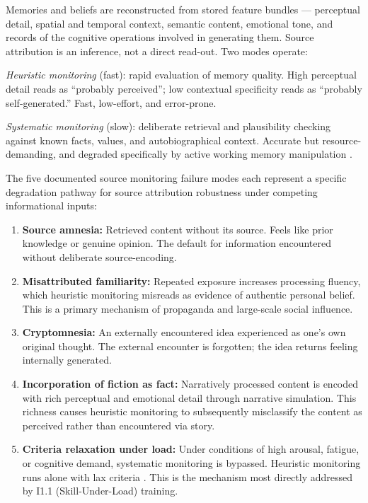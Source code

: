 \documentclass[12pt, a4paper]{article}
\begin{document}
Memories and beliefs are reconstructed from stored feature bundles --- perceptual
detail, spatial and temporal context, semantic content, emotional tone, and records
of the cognitive operations involved in generating them. Source attribution is an
inference, not a direct read-out. Two modes operate:

\emph{Heuristic monitoring} (fast): rapid evaluation of memory quality. High
perceptual detail reads as ``probably perceived''; low contextual specificity reads
as ``probably self-generated.'' Fast, low-effort, and error-prone.

\emph{Systematic monitoring} (slow): deliberate retrieval and plausibility checking
against known facts, values, and autobiographical context. Accurate but
resource-demanding, and degraded specifically by active working memory manipulation
\citep{maniscalco2015}.

The five documented source monitoring failure modes each represent a specific
degradation pathway for source attribution robustness under competing informational inputs:

\begin{enumerate}[leftmargin=2em]
\item \textbf{Source amnesia:} Retrieved content without its source. Feels like prior
knowledge or genuine opinion. The default for information encountered without
deliberate source-encoding.
\item \textbf{Misattributed familiarity:} Repeated exposure increases processing
fluency, which heuristic monitoring misreads as evidence of authentic personal belief.
This is a primary mechanism of propaganda and large-scale social influence.
\item \textbf{Cryptomnesia:} An externally encountered idea experienced as one's own
original thought. The external encounter is forgotten; the idea returns feeling
internally generated.
\item \textbf{Incorporation of fiction as fact:} Narratively processed content is
encoded with rich perceptual and emotional detail through narrative simulation.
This richness causes heuristic monitoring to subsequently misclassify the content
as perceived rather than encountered via story.
\item \textbf{Criteria relaxation under load:} Under conditions of high arousal,
fatigue, or cognitive demand, systematic monitoring is bypassed. Heuristic monitoring
runs alone with lax criteria \citep{maniscalco2015}. This is the mechanism most
directly addressed by I1.1 (Skill-Under-Load) training.
\end{enumerate}
\end{document}
